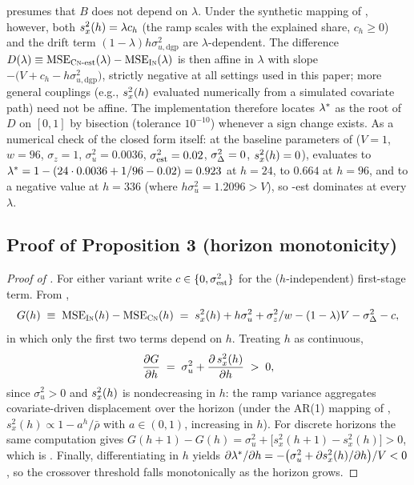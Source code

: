 \begin{remark}\label{rem:app-numeric}
 presumes that $B$ does not depend on $\lambda$. Under the synthetic mapping of , however, both $s_x^2(h) = \lambda c_h$ (the ramp scales with the explained share, $c_h \ge 0$) and the drift term $(1-\lambda)h\sigma_{u,\mathrm{dgp}}^2$ are $\lambda$-dependent. The difference $D(\lambda) \equiv \mathrm{MSE}_{\textsc{Cn}\text{-est}}(\lambda) - \mathrm{MSE}_{\textsc{In}}(\lambda)$ is then affine in $\lambda$ with slope $-\big(V + c_h - h\sigma_{u,\mathrm{dgp}}^2\big)$, strictly negative at all settings used in this paper; more general couplings (e.g., $s_x^2(h)$ evaluated numerically from a simulated covariate path) need not be affine. The implementation therefore locates $\lambda^{*}$ as the root of $D$ on $[0,1]$ by bisection (tolerance $10^{-10}$) whenever a sign change exists. As a numerical check of the closed form itself: at the baseline parameters of  ($V=1$, $w=96$, $\sigma_z=1$, $\sigma_u^2=0.0036$, $\sigma_{\mathrm{est}}^2 = 0.02$, $\sigma_\Delta^2 = 0$, $s_x^2(h) = 0$),  evaluates to $\lambda^{*} = 1 - (24 \cdot 0.0036 + 1/96 - 0.02) = 0.923$ at $h=24$, to $0.664$ at $h=96$, and to a negative value at $h=336$ (where $h\sigma_u^2 = 1.2096 > V$), so \cnm{}-est dominates at every $\lambda$.
\end{remark}

\subsection{Proof of Proposition 3 (horizon monotonicity)}\label{app:proofs:prop3}

\begin{proof}[Proof of ]
For either \cnm{} variant write $c \in \{0, \sigma_{\mathrm{est}}^2\}$ for the ($h$-independent) first-stage term. From ,
\begin{equation}\label{eq:app-gap}
  G(h) \;\equiv\; \mathrm{MSE}_{\textsc{In}}(h) - \mathrm{MSE}_{\textsc{Cn}}(h)
  \;=\; s_x^2(h) + h\sigma_u^2 + \sigma_z^2/w - (1-\lambda)V - \sigma_\Delta^2 - c ,
\end{equation}
in which only the first two terms depend on $h$. Treating $h$ as continuous,
\begin{equation}
  \frac{\partial G}{\partial h} \;=\; \sigma_u^2 + \frac{\partial\, s_x^2(h)}{\partial h} \;>\; 0 ,
\end{equation}
since $\sigma_u^2 > 0$ and $s_x^2(h)$ is nondecreasing in $h$: the ramp variance aggregates covariate-driven displacement over the horizon (under the AR(1) mapping of , $s_x^2(h) \propto 1 - a^h/\bar\rho$ with $a \in (0,1)$, increasing in $h$). For discrete horizons the same computation gives $G(h+1) - G(h) = \sigma_u^2 + \big[s_x^2(h{+}1) - s_x^2(h)\big] > 0$, which is . Finally, differentiating  in $h$ yields $\partial \lambda^{*} / \partial h = -\big(\sigma_u^2 + \partial s_x^2(h)/\partial h\big)/V < 0$, so the crossover threshold falls monotonically as the horizon grows.
\end{proof}

